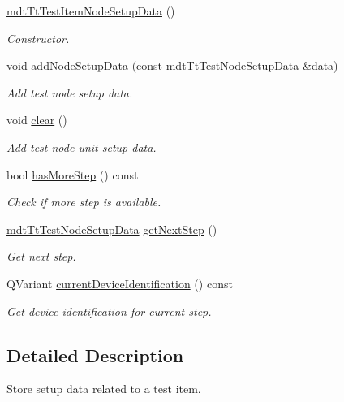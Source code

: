 \begin{DoxyCompactItemize}
\item 
\hyperlink{classmdt_tt_test_item_node_setup_data_a5a833d47755b0e0cd42a497837154add}{mdt\-Tt\-Test\-Item\-Node\-Setup\-Data} ()
\begin{DoxyCompactList}\small\item\em Constructor. \end{DoxyCompactList}\item 
void \hyperlink{classmdt_tt_test_item_node_setup_data_a2c58ca8c543b503e7d96d3f13112078f}{add\-Node\-Setup\-Data} (const \hyperlink{classmdt_tt_test_node_setup_data}{mdt\-Tt\-Test\-Node\-Setup\-Data} \&data)
\begin{DoxyCompactList}\small\item\em Add test node setup data. \end{DoxyCompactList}\item 
void \hyperlink{classmdt_tt_test_item_node_setup_data_a1e3ed3490ff43e90a4fea2256af8e4d2}{clear} ()
\begin{DoxyCompactList}\small\item\em Add test node unit setup data. \end{DoxyCompactList}\item 
bool \hyperlink{classmdt_tt_test_item_node_setup_data_ac3b94d30bf38bdb189d888a62b09b34d}{has\-More\-Step} () const 
\begin{DoxyCompactList}\small\item\em Check if more step is available. \end{DoxyCompactList}\item 
\hyperlink{classmdt_tt_test_node_setup_data}{mdt\-Tt\-Test\-Node\-Setup\-Data} \hyperlink{classmdt_tt_test_item_node_setup_data_a6b76f7d05863790639b1840cf2ca3f4c}{get\-Next\-Step} ()
\begin{DoxyCompactList}\small\item\em Get next step. \end{DoxyCompactList}\item 
Q\-Variant \hyperlink{classmdt_tt_test_item_node_setup_data_a8f34d5d3b6f2ad8d011edd7c070b9962}{current\-Device\-Identification} () const 
\begin{DoxyCompactList}\small\item\em Get device identification for current step. \end{DoxyCompactList}\end{DoxyCompactItemize}


\subsection{Detailed Description}
Store setup data related to a test item. 

